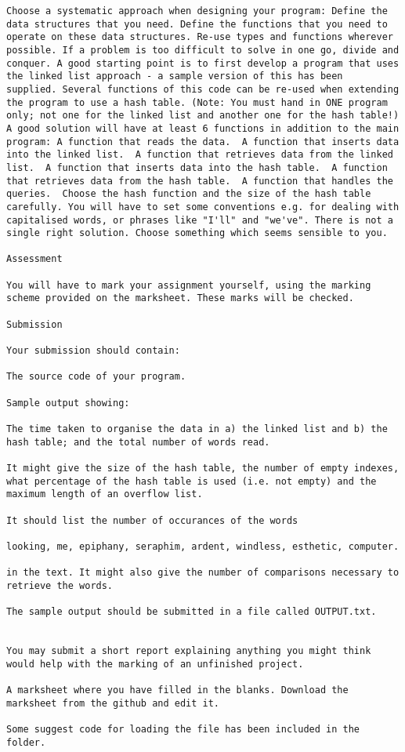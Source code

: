 \documentclass[11pt,a4paper]{scrartcl}
\begin{document}
\begin{verbatim}
Choose a systematic approach when designing your program: Define the
data structures that you need. Define the functions that you need to
operate on these data structures. Re-use types and functions wherever
possible. If a problem is too difficult to solve in one go, divide and
conquer. A good starting point is to first develop a program that uses
the linked list approach - a sample version of this has been
supplied. Several functions of this code can be re-used when extending
the program to use a hash table. (Note: You must hand in ONE program
only; not one for the linked list and another one for the hash table!)
A good solution will have at least 6 functions in addition to the main
program: A function that reads the data.  A function that inserts data
into the linked list.  A function that retrieves data from the linked
list.  A function that inserts data into the hash table.  A function
that retrieves data from the hash table.  A function that handles the
queries.  Choose the hash function and the size of the hash table
carefully. You will have to set some conventions e.g. for dealing with
capitalised words, or phrases like "I'll" and "we've". There is not a
single right solution. Choose something which seems sensible to you.

Assessment

You will have to mark your assignment yourself, using the marking
scheme provided on the marksheet. These marks will be checked.

Submission

Your submission should contain:

The source code of your program.

Sample output showing:

The time taken to organise the data in a) the linked list and b) the
hash table; and the total number of words read.

It might give the size of the hash table, the number of empty indexes,
what percentage of the hash table is used (i.e. not empty) and the
maximum length of an overflow list.

It should list the number of occurances of the words

looking, me, epiphany, seraphim, ardent, windless, esthetic, computer.

in the text. It might also give the number of comparisons necessary to retrieve the words.

The sample output should be submitted in a file called OUTPUT.txt.


You may submit a short report explaining anything you might think
would help with the marking of an unfinished project.

A marksheet where you have filled in the blanks. Download the
marksheet from the github and edit it.

Some suggest code for loading the file has been included in the folder.
\end{verbatim}
\end{document}
